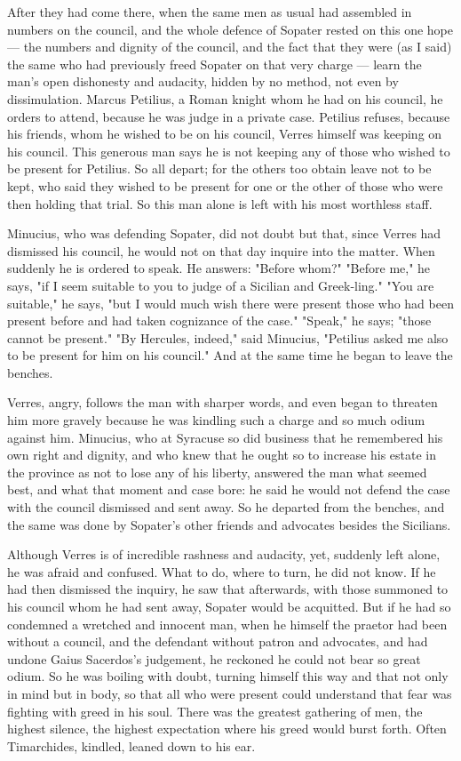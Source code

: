  After they had come there, when the same men as usual had assembled in numbers on the council, and the whole defence of Sopater rested on this one hope --- the numbers and dignity of the council, and the fact that they were (as I said) the same who had previously freed Sopater on that very charge --- learn the man's open dishonesty and audacity, hidden by no method, not even by dissimulation. Marcus Petilius, a Roman knight whom he had on his council, he orders to attend, because he was judge in a private case. Petilius refuses, because his friends, whom he wished to be on his council, Verres himself was keeping on his council. This generous man says he is not keeping any of those who wished to be present for Petilius. So all depart; for the others too obtain leave not to be kept, who said they wished to be present for one or the other of those who were then holding that trial. So this man alone is left with his most worthless staff.

 Minucius, who was defending Sopater, did not doubt but that, since Verres had dismissed his council, he would not on that day inquire into the matter. When suddenly he is ordered to speak. He answers: "Before whom?" "Before me," he says, "if I seem suitable to you to judge of a Sicilian and Greek-ling." "You are suitable," he says, "but I would much wish there were present those who had been present before and had taken cognizance of the case." "Speak," he says; "those cannot be present." "By Hercules, indeed," said Minucius, "Petilius asked me also to be present for him on his council." And at the same time he began to leave the benches.

 Verres, angry, follows the man with sharper words, and even began to threaten him more gravely because he was kindling such a charge and so much odium against him. Minucius, who at Syracuse so did business that he remembered his own right and dignity, and who knew that he ought so to increase his estate in the province as not to lose any of his liberty, answered the man what seemed best, and what that moment and case bore: he said he would not defend the case with the council dismissed and sent away. So he departed from the benches, and the same was done by Sopater's other friends and advocates besides the Sicilians.

 Although Verres is of incredible rashness and audacity, yet, suddenly left alone, he was afraid and confused. What to do, where to turn, he did not know. If he had then dismissed the inquiry, he saw that afterwards, with those summoned to his council whom he had sent away, Sopater would be acquitted. But if he had so condemned a wretched and innocent man, when he himself the praetor had been without a council, and the defendant without patron and advocates, and had undone Gaius Sacerdos's judgement, he reckoned he could not bear so great odium. So he was boiling with doubt, turning himself this way and that not only in mind but in body, so that all who were present could understand that fear was fighting with greed in his soul. There was the greatest gathering of men, the highest silence, the highest expectation where his greed would burst forth. Often Timarchides, kindled, leaned down to his ear.

